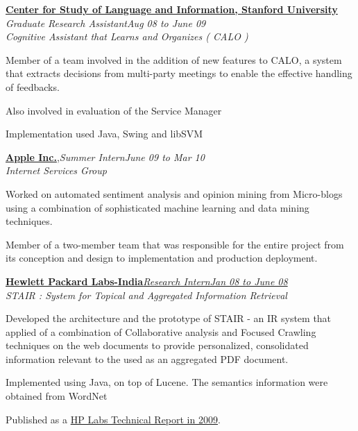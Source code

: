 \documentclass[10pt]{article}
\newcommand{\blankline}{\vspace{0.25cm}}
\begin{document}
\blankline

\href{http://www-csli.stanford.edu/}{\textbf{Center for Study of Language and Information, Stanford University}}\\
\textit{Graduate Research Assistant}\hfill \textit{Aug 08 to June 09}\\
 \emph{Cognitive Assistant that Learns and  Organizes ( CALO )}
       \begin{compactitem}
        \item Member of a team involved in the addition of new features to CALO, a system that extracts decisions from multi-party meetings  to enable the effective handling of feedbacks.
        \item Also involved in evaluation of the Service Manager
        \item Implementation used Java, Swing and libSVM
       \end{compactitem}

\href{http://www.apple.com}{\textbf{Apple Inc.}},\hspace{1cm}\textit{Summer Intern}\hfill \textit{June 09 to Mar 10}\\
 \emph{Internet Services Group}
       \begin{compactitem}
        \item {Worked on automated sentiment analysis and opinion mining from Micro-blogs using a combination of sophisticated machine learning and data mining techniques.}
        \item {Member of a two-member team that was responsible for the entire project from its conception and design to implementation and production deployment. }
       \end{compactitem}

\blankline

\href{http://www.hpl.hp.com/india/}{\textbf{Hewlett Packard Labs-India}\hspace{1cm}\textit{Research Intern}\hfill \textit{Jan 08 to June 08}}\\
\emph{STAIR : System for Topical and Aggregated Information Retrieval}
       \begin{compactitem}
        \item {Developed the architecture and the prototype of STAIR - an IR system that  applied of a combination of Collaborative analysis and Focused Crawling techniques on the web documents to provide personalized, consolidated information relevant to the used as an aggregated PDF document.}
        
        \item {Implemented using Java, on top of Lucene. The semantics information were obtained from WordNet}
        \item Published as a \href{http://www.hpl.hp.com/techreports/2009/HPL-2009-51.pdf}{HP Labs Technical Report in 2009}.
       \end{compactitem}
\end{document}
